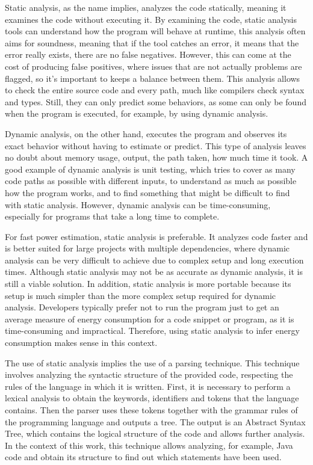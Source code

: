 \documentclass[sigplan]{acmart}
\begin{document}
Static analysis, as the name implies, analyzes the code statically, meaning it examines the code without executing it. By examining the code, static analysis tools can understand how the program will behave at runtime\cite{ernst2003static}, this analysis often aims for soundness, meaning that if the tool catches an error, it means that the error really exists, there are no false negatives. However, this can come at the cost of producing false positives, where issues that are not actually problems are flagged, so it's important to keeps a balance between them. This analysis allows to check the entire source code and every path, much like compilers check syntax and types. Still, they can only predict some behaviors, as some can only be found when the program is executed, for example, by using dynamic analysis.

Dynamic analysis, on the other hand, executes the program and observes its exact behavior without having to estimate or predict. This type of analysis leaves no doubt about memory usage, output, the path taken, how much time it took\cite{ernst2003static}. A good example of dynamic analysis is unit testing, which tries to cover as many code paths as possible with different inputs, to understand as much as possible how the program works, and to find something that might be difficult to find with static analysis. However, dynamic analysis can be time-consuming, especially for programs that take a long time to complete.

For fast power estimation, static analysis is preferable. It analyzes code faster and is better suited for large projects with multiple dependencies, where dynamic analysis can be very difficult to achieve due to complex setup and long execution times. Although static analysis may not be as accurate as dynamic analysis, it is still a viable solution. In addition, static analysis is more portable because its setup is much simpler than the more complex setup required for dynamic analysis.
Developers typically prefer not to run the program just to get an average measure of energy consumption for a code snippet or program, as it is time-consuming and impractical. Therefore, using static analysis to infer energy consumption makes sense in this context.

The use of static analysis implies the use of a parsing technique. This technique involves analyzing the syntactic structure of the provided code, respecting the rules of the language in which it is written. First, it is necessary to perform a lexical analysis to obtain the keywords, identifiers and tokens that the language contains. Then the parser uses these tokens together with the grammar rules of the programming language and outputs a tree. The output is an Abstract Syntax Tree, which contains the logical structure of the code and allows further analysis. In the context of this work, this technique allows analyzing, for example, Java code and obtain its structure to find out which statements have been used.
\end{document}
